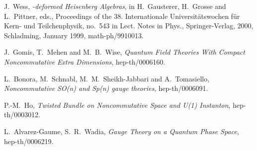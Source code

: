 \documentclass[a4paper,11pt]{article}
\begin{document}
\begin{thebibliography}{99}
 J.~Wess, {\it {}\coordHE{}-deformed Heisenberg Algebras}, in H.~Gausterer,
H.~Grosse and L.~Pittner, eds., Proceedings of the 38. Internationale
Universit\"atswochen f\"ur Kern- und Teilchenphysik, no.\ 543 in Lect. Notes
in Phys., Springer-Verlag, 2000, Schladming, January 1999, math-ph/9910013.

 J.~Gomis, T.~Mehen and M.~B.~Wise, {\it Quantum Field Theories
With Compact Noncommutative Extra Dimensions}, hep-th/0006160.

L.~Bonora, M.~Schnabl, M.~M.~Sheikh-Jabbari and A.~Tomasiello,
{\it Noncommutative SO(n) and Sp(n) gauge theories},
hep-th/0006091.

 P.-M.~Ho, {\it Twisted Bundle on Noncommutative Space and U(1)
Instanton}, hep-th/0003012.

 L.~Alvarez-Gaume, S.~R.~Wadia, {\it Gauge Theory on a 
Quantum Phase Space}, hep-th/0006219.


\end{thebibliography}

\end{document}

